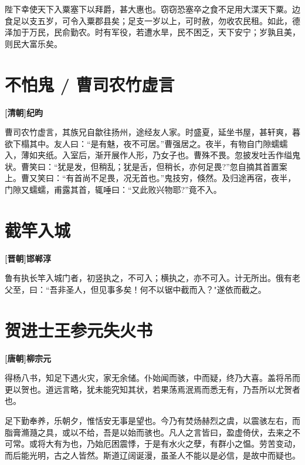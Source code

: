 \documentclass[UTF8,titlepage,oneside]{ctexbook}
\begin{document}
陛下幸使天下入粟塞下以拜爵，甚大惠也。窃窃恐塞卒之食不足用大渫天下粟。边食足以支五岁，可令入粟郡县矣；足支一岁以上，可时赦，勿收农民租。如此，德泽加于万民，民俞勤农。时有军役，若遭水旱，民不困乏，天下安宁；岁孰且美，则民大富乐矣。


\chapter*{不怕鬼 / 曹司农竹虚言}
\begin{center}
	\textbf{[清朝]纪昀}
\end{center}


曹司农竹虚言，其族兄自歙往扬州，途经友人家。时盛夏，延坐书屋，甚轩爽，暮欲下榻其中。友人曰：“是有魅，夜不可居。”曹强居之。夜半，有物自门隙蠕蠕入，薄如夹纸。入室后，渐开展作人形，乃女子也。曹殊不畏。忽披发吐舌作缢鬼状。曹笑曰：“犹是发，但稍乱；犹是舌，但稍长，亦何足畏?”忽自摘其首置案上。曹又笑曰：“有首尚不足畏，况无首也。”鬼技穷，倏然。及归途再宿，夜半，门隙又蠕蠕，甫露其首，辄唾曰：“又此败兴物耶?”竟不入。

\chapter*{截竿入城}
\begin{center}
	\textbf{[晋朝]邯郸淳}
\end{center}


鲁有执长竿入城门者，初竖执之，不可入；横执之，亦不可入。计无所出。俄有老父至，曰：“吾非圣人，但见事多矣！何不以锯中截而入？"遂依而截之。

\chapter*{贺进士王参元失火书}
\begin{center}
	\textbf{[唐朝]柳宗元}
\end{center}

得杨八书，知足下遇火灾，家无余储。仆始闻而骇，中而疑，终乃大喜。盖将吊而更以贺也。道远言略，犹未能究知其状，若果荡焉泯焉而悉无有，乃吾所以尤贺者也。

足下勤奉养，乐朝夕，惟恬安无事是望也。今乃有焚炀赫烈之虞，以震骇左右，而脂膏滫瀡之具，或以不给，吾是以始而骇也。凡人之言皆曰，盈虚倚伏，去来之不可常。或将大有为也，乃始厄困震悸，于是有水火之孽，有群小之愠。劳苦变动，而后能光明，古之人皆然。斯道辽阔诞漫，虽圣人不能以是必信，是故中而疑也。
\end{document}
